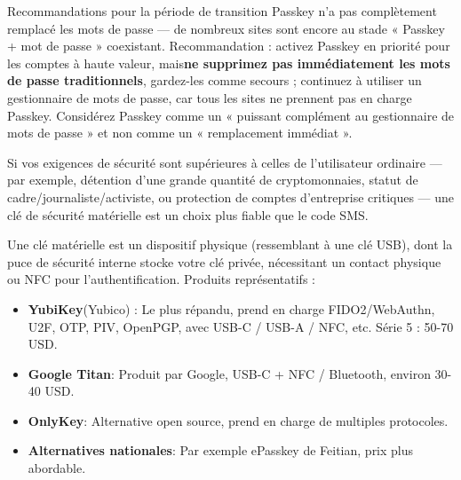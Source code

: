\begin{tcbwarn}{Recommandations pour la période de transition}
Passkey n'a pas complètement remplacé les mots de passe — de nombreux sites sont encore au stade « Passkey + mot de passe » coexistant. Recommandation : activez Passkey en priorité pour les comptes à haute valeur, mais\textbf{ne supprimez pas immédiatement les mots de passe traditionnels}, gardez-les comme secours ; continuez à utiliser un gestionnaire de mots de passe, car tous les sites ne prennent pas en charge Passkey. Considérez Passkey comme un « puissant complément au gestionnaire de mots de passe » et non comme un « remplacement immédiat ».

\end{tcbwarn}


Si vos exigences de sécurité sont supérieures à celles de l'utilisateur ordinaire — par exemple, détention d'une grande quantité de cryptomonnaies, statut de cadre/journaliste/activiste, ou protection de comptes d'entreprise critiques — une clé de sécurité matérielle est un choix plus fiable que le code SMS.


Une clé matérielle est un dispositif physique (ressemblant à une clé USB), dont la puce de sécurité interne stocke votre clé privée, nécessitant un contact physique ou NFC pour l'authentification. Produits représentatifs :

\begin{itemize}
  \item \textbf{YubiKey}(Yubico) : Le plus répandu, prend en charge FIDO2/WebAuthn, U2F, OTP, PIV, OpenPGP, avec USB-C / USB-A / NFC, etc. Série 5 : 50-70 USD.
  \item \textbf{Google Titan}: Produit par Google, USB-C + NFC / Bluetooth, environ 30-40 USD.
  \item \textbf{OnlyKey}: Alternative open source, prend en charge de multiples protocoles.
  \item \textbf{Alternatives nationales}: Par exemple ePasskey de Feitian, prix plus abordable.
\end{itemize}


